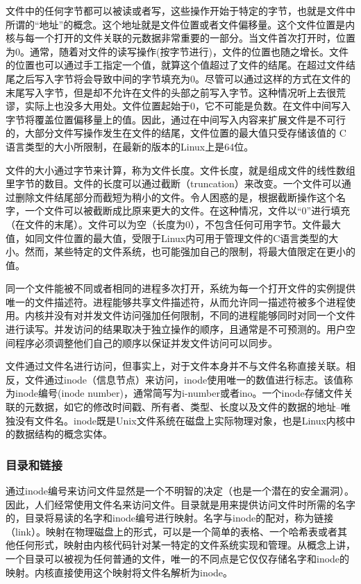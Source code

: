 文件中的任何字节都可以被读或者写，这些操作开始于特定的字节，也就是文件中所谓的“地址”的概念。这个地址就是文件位置或者文件偏移量。这个文件位置是内核与每一个打开的文件关联的元数据非常重要的一部分。当文件首次打开时，位置为0。通常，随着对文件的读写操作(按字节进行)，文件的位置也随之增长。文件的位置也可以通过手工指定一个值，就算这个值超过了文件的结尾。在超过文件结尾之后写入字节将会导致中间的字节填充为0。尽管可以通过这样的方式在文件的末尾写入字节，但是却不允许在文件的头部之前写入字节。这种情况听上去很荒谬，实际上也没多大用处。文件位置起始于0，它不可能是负数。在文件中间写入字节将覆盖位置偏移量上的值。因此，通过在中间写入内容来扩展文件是不可行的，大部分文件写操作发生在文件的结尾，文件位置的最大值只受存储该值的 C语言类型的大小所限制，在最新的版本的Linux上是64位。

文件的大小通过字节来计算，称为文件长度。文件长度，就是组成文件的线性数组里字节的数目。文件的长度可以通过截断（truncation）来改变。一个文件可以通过删除文件结尾部分而截短为稍小的文件。令人困惑的是，根据截断操作这个名字，一个文件可以被截断成比原来更大的文件。在这种情况，文件以“0”进行填充（在文件的末尾）。文件可以为空（长度为0），不包含任何可用字节。文件最大值，如同文件位置的最大值，受限于Linux内可用于管理文件的C语言类型的大小。然而，某些特定的文件系统，也可能强加自己的限制，将最大值限定在更小的值。

同一个文件能被不同或者相同的进程多次打开，系统为每一个打开文件的实例提供唯一的文件描述符。进程能够共享文件描述符，从而允许同一描述符被多个进程使用。内核并没有对并发文件访问强加任何限制，不同的进程能够同时对同一个文件进行读写。并发访问的结果取决于独立操作的顺序，且通常是不可预测的。用户空间程序必须调整他们自己的顺序以保证并发文件访问可以同步。

文件通过文件名进行访问，但事实上，对于文件本身并不与文件名称直接关联。相反，文件通过inode（信息节点）来访问，inode使用唯一的数值进行标志。该值称为inode编号(inode number)，通常简写为i-number或者ino。一个inode存储文件关联的元数据，如它的修改时间戳、所有者、类型、长度以及文件的数据的地址--唯独没有文件名。inode既是Unix文件系统在磁盘上实际物理对象，也是Linux内核中的数据结构的概念实体。

\subsubsection{目录和链接}

通过inode编号来访问文件显然是一个不明智的决定（也是一个潜在的安全漏洞）。因此，人们经常使用文件名来访问文件。目录就是用来提供访问文件时所需的名字的，目录将易读的名字和inode编号进行映射。名字与inode的配对，称为链接（link）。映射在物理磁盘上的形式，可以是一个简单的表格、一个哈希表或者其他任何形式，映射由内核代码针对某一特定的文件系统实现和管理。从概念上讲，一个目录可以被视为任何普通的文件，唯一的不同点是它仅仅存储名字和inode的映射。内核直接使用这个映射将文件名解析为inode。

